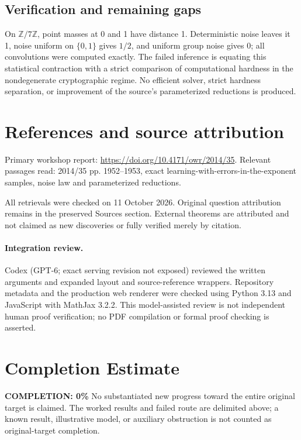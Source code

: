 \documentclass[11pt]{article}
\begin{document}
\subsection{Verification and remaining gaps}
On $\mathbb Z/7\mathbb Z$, point masses at 0 and 1 have distance 1. Deterministic noise leaves it 1, noise uniform on $\{0,1\}$ gives $1/2$, and uniform group noise gives 0; all convolutions were computed exactly. The failed inference is equating this statistical contraction with a strict comparison of computational hardness in the nondegenerate cryptographic regime. No efficient solver, strict hardness separation, or improvement of the source's parameterized reductions is produced.

\section{References and source attribution}
Primary workshop report: \url{https://doi.org/10.4171/owr/2014/35}. Relevant passages read: 2014/35 pp. 1952--1953, exact learning-with-errors-in-the-exponent samples, noise law and parameterized reductions.

All retrievals were checked on 11 October 2026. Original question attribution remains in the preserved Sources section. External theorems are attributed and not claimed as new discoveries or fully verified merely by citation.


\paragraph{Integration review.} Codex (GPT-6; exact serving revision not exposed) reviewed the written arguments and expanded layout and source-reference wrappers. Repository metadata and the production web renderer were checked using Python 3.13 and JavaScript with MathJax 3.2.2. This model-assisted review is not independent human proof verification; no PDF compilation or formal proof checking is asserted.

\section{Completion Estimate}
\noindent\textbf{COMPLETION: 0\%}
No substantiated new progress toward the entire original target is claimed. The worked results and failed route are delimited above; a known result, illustrative model, or auxiliary obstruction is not counted as original-target completion.
\end{document}
